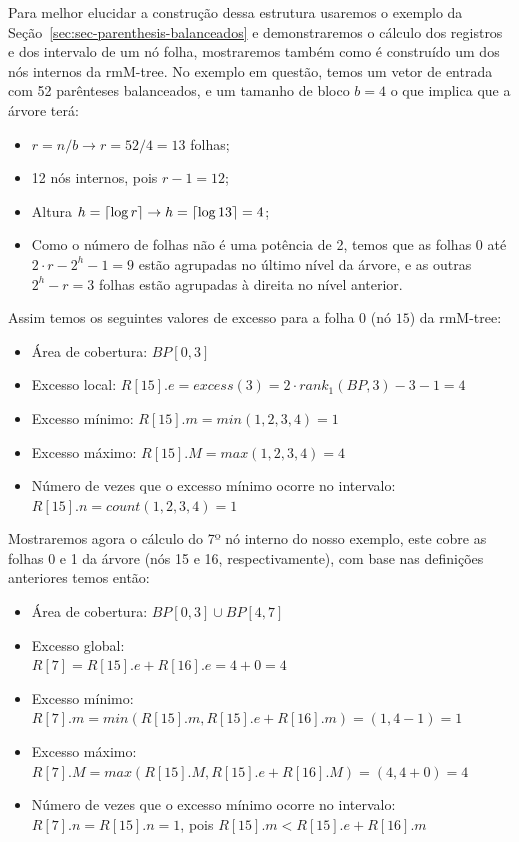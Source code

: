 \begin{example}\label{ex-build-tree}
    Para melhor elucidar a construção dessa estrutura usaremos o exemplo da Seção~\ref{sec:sec-parenthesis-balanceados} e demonstraremos o cálculo dos registros e dos intervalo de um nó folha, mostraremos também como é construído um dos nós internos da rmM-tree. No exemplo em questão, temos um vetor de entrada com 52 parênteses balanceados, e um tamanho de bloco $b = 4$ o que implica que a árvore terá:

    \begin{itemize}
        \item $r = n/b \to r = 52/4 = 13 $ folhas;
        \item 12 nós internos, pois $r-1 = 12$;
        \item Altura $h= \lceil\log r\rceil \to h = \lceil\log 13\rceil= 4$;
        \item Como o número de folhas não é uma potência de 2, temos que as folhas $0$ até $2 \cdot r - 2^h  -1 = 9$ estão agrupadas no último nível da árvore,  e as outras $2^h - r = 3$ folhas estão agrupadas à direita no nível anterior.
    \end{itemize}

    Assim temos os seguintes valores de excesso para a folha $0$ (nó $15$) da rmM-tree:
        \begin{itemize}
            \item  Área de cobertura:
            $ BP[0,3]$
            \item Excesso local:
            $R[15].e = excess(3) = 2 \cdot rank_1(BP,3) - 3 - 1= 4$
            \item Excesso mínimo:
            $R[15].m = min(1,2,3,4) = 1$
            \item Excesso máximo:
            $R[15].M = max(1,2,3,4) = 4$
            \item Número de vezes que o excesso mínimo ocorre no intervalo:\\
            $R[15].n = count(1,2,3,4) = 1$
        \end{itemize}
        
    Mostraremos agora o cálculo do 7º nó interno do nosso exemplo, este cobre as folhas 0 e 1 da árvore (nós 15 e 16, respectivamente), com base nas definições anteriores temos então:
    \begin{itemize}
        \item Área de cobertura: $BP[0,3] \cup BP[4,7]$
        \item Excesso global: \\
        $R[7] = R[15].e + R[16].e = 4 + 0 = 4$
        \item Excesso mínimo:\\
        $R[7].m = min(R[15].m, R[15].e+R[16].m) = (1,4-1)=1$
        \item Excesso máximo:\\
        $R[7].M = max(R[15].M, R[15].e+R[16].M) = (4,4+0)=4$
        \item Número de vezes que o excesso mínimo ocorre no intervalo:\\
        $R[7].n = R[15].n = 1$,  pois $R[15].m < R[15].e+R[16].m$
    \end{itemize}


\end{example}
